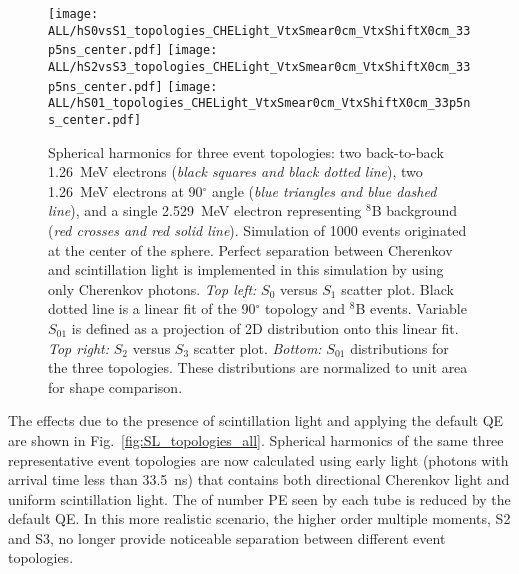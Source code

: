\begin{figure*}[h]
  \centering
  \texttt{[image: ALL/hS0vsS1\_topologies\_CHELight\_VtxSmear0cm\_VtxShiftX0cm\_33p5ns\_center.pdf]}
  \texttt{[image: ALL/hS2vsS3\_topologies\_CHELight\_VtxSmear0cm\_VtxShiftX0cm\_33p5ns\_center.pdf]}
  \texttt{[image: ALL/hS01\_topologies\_CHELight\_VtxSmear0cm\_VtxShiftX0cm\_33p5ns\_center.pdf]}
  \caption{Spherical harmonics for three event topologies: two
    back-to-back 1.26~MeV electrons (\emph{black squares and black
      dotted line}), two 1.26~MeV electrons at 90$^{\circ}$ angle
    (\emph{blue triangles and blue dashed line}), and a single
    2.529~MeV electron representing $^{8}$B background (\emph{red
      crosses and red solid line}). Simulation of 1000 events
    originated at the center of the sphere. Perfect separation between
    Cherenkov and scintillation light is implemented in this
    simulation by using only Cherenkov photons. \emph{Top left:} $S_0$
    versus $S_1$ scatter plot. Black dotted line is a linear fit of
    the 90$^{\circ}$ topology and $^{8}$B events. Variable $S_{01}$ is
    defined as a projection of 2D distribution onto this linear
    fit. \emph{Top right:} $S_2$ versus $S_3$ scatter
    plot. \emph{Bottom:} $S_{01}$ distributions for the three
    topologies. These distributions are normalized to unit area for
    shape comparison.}
  \label{fig:SL_topologies_CHE}
\end{figure*}


The effects due to the presence of scintillation light and applying the default QE are shown in Fig.~\ref{fig:SL_topologies_all}. Spherical harmonics of the same three representative event topologies are now calculated using early light (photons with arrival time less than 33.5~ns) that contains both directional Cherenkov light and uniform scintillation light. The of number PE seen by each tube is reduced by the default QE. In this more realistic scenario, the higher order multiple moments, S2 and S3, no longer provide noticeable separation between different event topologies.


